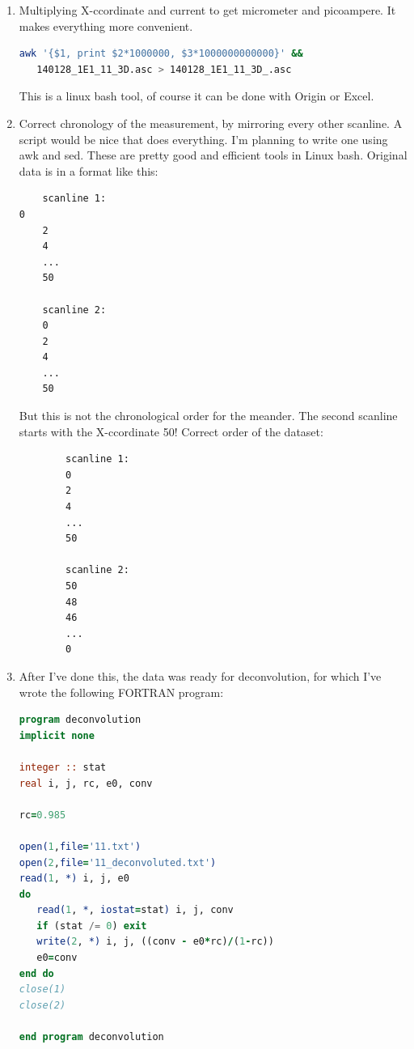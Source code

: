 \documentclass[a4paper, 11pt]{article}
\begin{document}
\begin{enumerate}
\item Multiplying X-ccordinate and current to get micrometer and picoampere. It makes everything more convenient.
   
\begin{lstlisting}[language=bash]
   awk '{$1, print $2*1000000, $3*1000000000000}' &&
   140128_1E1_11_3D.asc > 140128_1E1_11_3D_.asc
\end{lstlisting}

   This is a linux bash tool, of course it can be done with Origin or Excel.

\item Correct chronology of the measurement, by mirroring every other scanline. A script would be nice that does everything. I'm planning to write one using awk and sed. These are pretty good and efficient tools in Linux bash. Original data is in a format like this:

\begin{verbatim}
	scanline 1:
0
	2
	4
	...
	50

	scanline 2:
	0
	2
	4
	...
	50
\end{verbatim}

   But this is not the chronological order for the meander. The second scanline starts with the X-ccordinate 50! Correct order of the dataset:

\begin{verbatim}
        scanline 1:
        0
        2
        4
        ...
        50

        scanline 2:
        50
        48
        46
        ...
        0
\end{verbatim}

\item After I've done this, the data was ready for deconvolution, for which I've wrote the following FORTRAN program:

\begin{lstlisting}[language=fortran]
program deconvolution
implicit none

integer :: stat
real i, j, rc, e0, conv

rc=0.985

open(1,file='11.txt')
open(2,file='11_deconvoluted.txt')
read(1, *) i, j, e0
do
   read(1, *, iostat=stat) i, j, conv
   if (stat /= 0) exit
   write(2, *) i, j, ((conv - e0*rc)/(1-rc))
   e0=conv
end do
close(1) 
close(2)

end program deconvolution
\end{lstlisting}


\end{enumerate}
\end{document}
